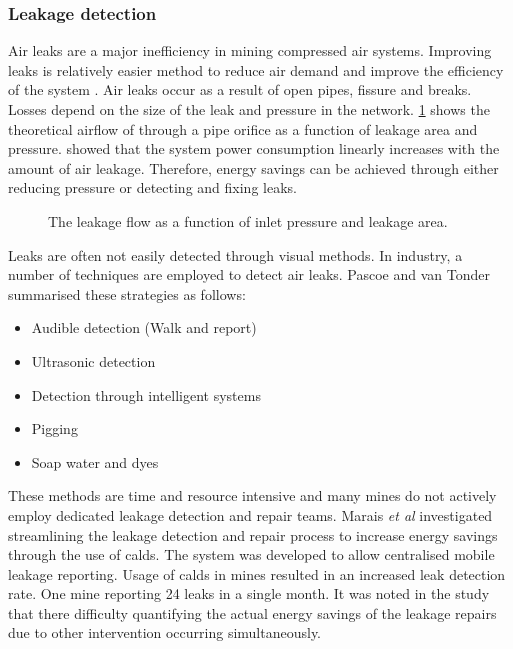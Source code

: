 		 \subsubsection{Leakage detection}	 
		 Air leaks are a major inefficiency in mining compressed air systems. Improving leaks is relatively easier method to  reduce air demand and improve the efficiency of the system  \cite{van2011sustaining}. Air leaks occur as a result of open pipes, fissure and breaks. Losses depend on the size of the leak and pressure in the network. \cref{fig: Leak losses} shows the theoretical airflow of through a pipe orifice as a function of leakage area and pressure\footnotemark[1]. \cite{van2011sustaining} showed that the system power consumption linearly increases with the amount of air leakage. Therefore, energy savings can be achieved through either reducing pressure or detecting and fixing leaks.
		 \begin{figure}[h]
		 	\centering
		 	\fbox{\hspace{2cm}\hspace{2cm}}
		 	\caption[The leakage flow as a function of inlet pressure and leakage area]{ The leakage flow as a function of inlet pressure and leakage area\protect\footnotemark[1].}
		 	\label{fig: Leak losses}
		 \end{figure}
	 \par 
		 Leaks are often not easily detected through visual methods. In industry, a number of techniques are employed to detect air leaks. Pascoe \cite{Pascoe2016Masters} and van Tonder \cite{vanTonder2010Masters} summarised these strategies as follows:
		 \begin{itemize}
		 	\item Audible detection (Walk and report)
		 	\item Ultrasonic detection
		 	\item Detection through intelligent systems
		 	\item Pigging
		 	\item Soap water and dyes
		 \end{itemize}
	 	 These methods are time and resource intensive and many mines do not actively employ dedicated leakage detection and repair teams. Marais \textit{et al} \cite{marais2009increased} investigated streamlining the leakage detection and repair process to increase energy savings through the use of \gls{calds}. The system was developed to allow centralised mobile leakage reporting. Usage of \gls{calds} in mines resulted in an increased leak detection rate. One mine reporting 24 leaks in a single month. It was noted in the study that there difficulty quantifying the actual energy savings of the leakage repairs due to other intervention occurring simultaneously.	
		 

